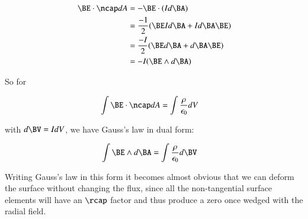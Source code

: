 \begin{align*}
\BE \cdot \ncap dA
&= -\BE \cdot (I d\BA) \\
&= \frac{-1}{2} ( \BE I d\BA + I d\BA \BE ) \\
&= \frac{-I}{2} ( \BE d\BA + d\BA \BE ) \\
&= -I ( \BE \wedge d\BA )
\end{align*}

So for

\begin{align*}
\int \BE \cdot \ncap dA
&= \int \frac{\rho}{\epsilon_0} dV
\end{align*}

with $d\BV = I dV$, we have Gauss's law in dual form:

\begin{align*}
\int \BE \wedge d\BA &= \int \frac{\rho}{\epsilon_0} d\BV
\end{align*}

Writing Gauss's law in this form it becomes almost obvious that we can 
deform the surface without changing the flux, since all the non-tangential
surface elements will have an $\rcap$ factor and thus produce a zero
once wedged with the radial field.


